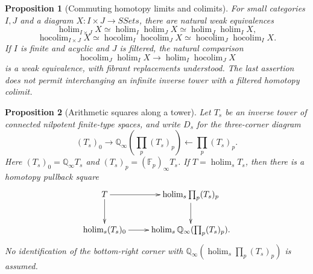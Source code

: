 \documentclass[10pt,a4paper]{amsart}
\newtheorem{proposition}{Proposition}
\begin{document}
\begin{proposition}[Commuting homotopy limits and colimits]\label{hofubini}
For small categories $I,J$ and a diagram $X:I\times J\to SSets$, there
are natural weak equivalences
\[
 \operatorname{holim}_{I\times J}X\simeq
 \operatorname{holim}_I\operatorname{holim}_JX\simeq
 \operatorname{holim}_J\operatorname{holim}_IX,
\]
\[
 \operatorname{hocolim}_{I\times J}X\simeq
 \operatorname{hocolim}_I\operatorname{hocolim}_JX\simeq
 \operatorname{hocolim}_J\operatorname{hocolim}_IX.
\]
If $I$ is finite and acyclic and $J$ is filtered, the natural comparison
\[
 \operatorname{hocolim}_J\operatorname{holim}_IX
 \longrightarrow\operatorname{holim}_I\operatorname{hocolim}_JX
\]
is a weak equivalence, with fibrant replacements understood.  The last
assertion does not permit interchanging an infinite inverse tower with
a filtered homotopy colimit.
\end{proposition}

\begin{proposition}[Arithmetic squares along a tower]\label{cx5}
Let $T_s$ be an inverse tower of connected nilpotent finite-type spaces,
and write $D_s$ for the three-corner diagram
\[
 (T_s)_0\longrightarrow\mathbb Q_\infty\!\left(\prod_p(T_s)_p\right)
 \longleftarrow\prod_p(T_s)_p.
\]
Here $(T_s)_0=\mathbb Q_\infty T_s$ and
$(T_s)_p=(\mathbb F_p)_\infty T_s$.  If $T=\operatorname{holim}_sT_s$,
then there is a homotopy pullback square
\begin{equation}\label{as}
\xymatrix{
 T\ar[r]\ar[d] &\operatorname{holim}_s\prod_p(T_s)_p\ar[d]\\
 \operatorname{holim}_s(T_s)_0\ar[r] &
 \operatorname{holim}_s\mathbb Q_\infty(\prod_p(T_s)_p).}
\end{equation}
No identification of the bottom-right corner with
$\mathbb Q_\infty(\operatorname{holim}_s\prod_p(T_s)_p)$ is assumed.
\end{proposition}
\end{document}
